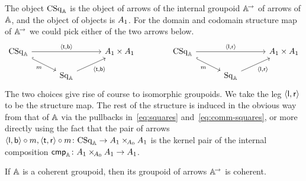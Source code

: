 \documentclass[a4paper,11pt]{amsart}
\newcommand{\sqincat}[1]{\mathrm{Sq}_{#1}}
\newcommand{\Asqin}{\sqincat{\Agpdf}}
\newcommand{\csqincat}[1]{\mathrm{CSq}_{#1}}
\newcommand{\Acsqin}{\csqincat{\Agpdf}}
\newcommand{\arrgpdin}{^{\!\to}}
\begin{document}
The object $\Acsqin$ is the object of arrows of the internal groupoid $\Agpdf\arrgpdin$ of arrows of $\mathbb{A}$,
and the object of objects is ${A}_1$.
For the domain and codomain structure map of $\Agpdf\arrgpdin$ we could pick either of the two arrows below.
\begin{equation}\label{eq:sides}
\begin{tikzcd}[column sep=7ex, row sep=3ex]
	\Acsqin	\ar[dr,"m"',hook] \ar[rr,"\ple{\mathsf{t},\mathsf{b}}"]	&&	\Aargpdf \times \Aargpdf
	\\
	&	\Asqin	\ar[ur,"\ple{\mathsf{t},\mathsf{b}}"']
\end{tikzcd}
\hspace{9ex}
\begin{tikzcd}[column sep=7ex, row sep=3ex]
	\Acsqin	\ar[dr,"m"',hook] \ar[rr,"\ple{\mathsf{l},\mathsf{r}}"]	&&	\Aargpdf \times \Aargpdf
	\\
	&	\Asqin	\ar[ur,"\ple{\mathsf{l},\mathsf{r}}"']
\end{tikzcd}
\end{equation}
The two choices give rise of course to isomorphic groupoids.
We take the leg $\langle{\mathsf{l},\mathsf{r}}\rangle$ to be the structure map.
The rest of the structure is induced in the obvious way from that of $\mathbb{A}$ via the pullbacks in~\eqref{eq:squares} and~\eqref{eq:comm-squares},
or more directly using the fact that the pair of arrows
$\ple{\mathsf{l},\mathsf{b}}\arcmp m,\ple{\mathsf{t},\mathsf{r}}\arcmp m\colon \Acsqin \to \Aargpdf \times_{\!\Aobgpdf}\Aargpdf$
is the kernel pair of the internal composition $\mathsf{cmp}_{\mathbb{A}}\colon {A}_1 \times_{\!{A}_0}{A}_1 \to {A}_1$.


\begin{cor}\label{cor:arr-gpd}
	If $\mathbb{A}$ is a coherent groupoid,
	then its groupoid of arrows $\Agpdf\arrgpdin$ is coherent.
\end{cor}
\end{document}
